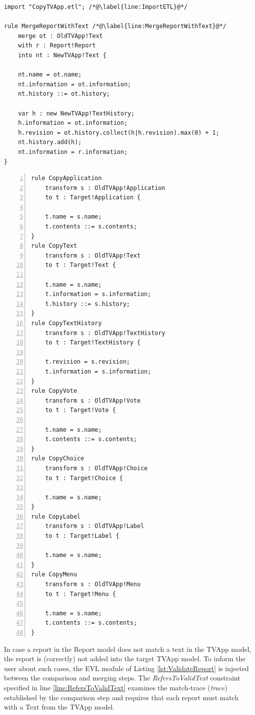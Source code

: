 \begin{lstlisting}[basicstyle=\ttfamily\footnotesize, nolol=true, flexiblecolumns=true, caption=EML module that merges a TVApp with a Report model, tabsize=2, label=lst:CaseStudyEML, language=EML]
import "CopyTVApp.etl"; /*@\label{line:ImportETL}@*/

rule MergeReportWithText /*@\label{line:MergeReportWithText}@*/
	merge ot : OldTVApp!Text
	with r : Report!Report 
	into nt : NewTVApp!Text {
	
	nt.name = ot.name;
	nt.information = ot.information;
	nt.history ::= ot.history;
	
	var h : new NewTVApp!TextHistory;
	h.information = ot.information;
	h.revision = ot.history.collect(h|h.revision).max(0) + 1;
	nt.history.add(h);
	nt.information = r.information;
}
\end{lstlisting}

\begin{lstlisting}[basicstyle=\ttfamily\footnotesize, flexiblecolumns=true, numbers=left, nolol=true, caption=ETL transformation that copies a TVApp module, label=lst:CaseStudyCopyETL, language=ETL, tabsize=2]
rule CopyApplication
	transform s : OldTVApp!Application
	to t : Target!Application {
	
	t.name = s.name;
	t.contents ::= s.contents;
}
rule CopyText
	transform s : OldTVApp!Text
	to t : Target!Text {

	t.name = s.name;
	t.information = s.information;
	t.history ::= s.history;
}
rule CopyTextHistory
	transform s : OldTVApp!TextHistory
	to t : Target!TextHistory {

	t.revision = s.revision;
	t.information = s.information;
}
rule CopyVote
	transform s : OldTVApp!Vote
	to t : Target!Vote {

	t.name = s.name;
	t.contents ::= s.contents;
}
rule CopyChoice
	transform s : OldTVApp!Choice
	to t : Target!Choice {

	t.name = s.name;
}
rule CopyLabel
	transform s : OldTVApp!Label
	to t : Target!Label {

	t.name = s.name;
}
rule CopyMenu
	transform s : OldTVApp!Menu
	to t : Target!Menu {
	
	t.name = s.name;
	t.contents ::= s.contents;
}
\end{lstlisting}

In case a report in the Report model does not match a text in the TVApp model, the report is (correctly) not added into the target TVApp model. To inform the user about such cases, the EVL module of Listing \ref{lst:ValidateReport} is injected between the comparison and merging steps. The \emph{RefersToValidText} constraint specified in line \ref{line:RefersToValidText} examines the match-trace (\emph{trace}) established by the comparison step and requires that each report must match with a Text from the TVApp model.

